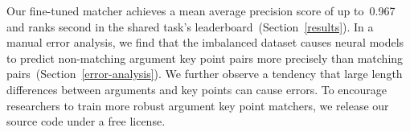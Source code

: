 Our fine-tuned \RobertaBase matcher achieves a mean average precision score of up to~0.967 and ranks second in the 
shared task's leaderboard~(Section~\ref{results}).
In a manual error analysis, we find that the imbalanced \ArgKP dataset causes neural models to predict non-matching 
argument key point pairs more precisely than matching pairs~(Section~\ref{error-analysis}).
We further observe a tendency that large length differences between arguments and key points can cause errors.
To encourage researchers to train more robust argument key point matchers, we release our source code under a free license.%
